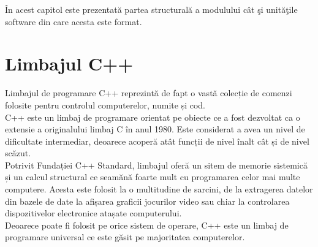 \label{cap3}


\label{Chapter3} %

\thispagestyle{fancy}

În acest capitol este prezentată partea structurală a modulului cât şi unităţile software din care acesta este format.

\section{Limbajul C++}
Limbajul de programare C++ reprezintă de fapt o vastă colecție de comenzi folosite pentru controlul computerelor, numite și cod.
\vspace{6pt}
\\C++ este un limbaj de programare orientat pe obiecte ce a fost dezvoltat ca o extensie a originalului limbaj C în anul 1980. Este considerat a avea un nivel de dificultate intermediar, deoarece acoperă atât funcții de nivel înalt cât și de nivel scăzut.
\vspace{6pt}
\\Potrivit Fundației C++ Standard, limbajul oferă un sitem de memorie sistemică și un calcul structural ce seamănă foarte mult cu programarea celor mai multe computere. Acesta este folosit la o multitudine de sarcini, de la extragerea datelor din bazele de date la afișarea graficii jocurilor video sau chiar la controlarea dispozitivelor electronice atașate computerului.
\vspace{6pt}
\\Deoarece poate fi folosit pe orice sistem de operare, C++ este un limbaj de programare universal ce este găsit pe majoritatea computerelor.

